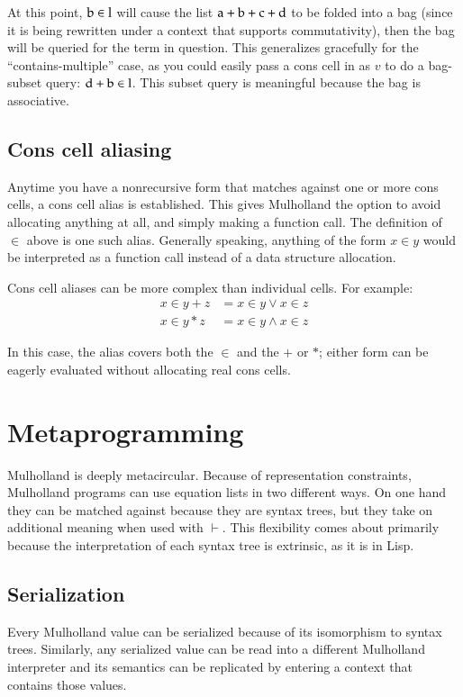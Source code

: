 \documentclass{report}
\def\rewrite {\vdash}
\begin{document}
    At this point, $\textrm b \in \textrm l$ will cause the list $\textrm a + \textrm b + \textrm c + \textrm d$ to be folded into a bag (since it is being rewritten under a
    context that supports commutativity), then the bag will be queried for the term in question. This generalizes gracefully for the ``contains-multiple'' case, as you could easily pass a cons
    cell in as $v$ to do a bag-subset query: $\textrm d + \textrm b \in \textrm l$. This subset query is meaningful because the bag is associative.

\section{Cons cell aliasing}
    Anytime you have a nonrecursive form that matches against one or more cons cells, a cons cell alias is established. This gives Mulholland the option to avoid allocating anything at all,
    and simply making a function call. The definition of $\in$ above is one such alias. Generally speaking, anything of the form $x \in y$ would be interpreted as a function call instead of a
    data structure allocation.

    Cons cell aliases can be more complex than individual cells. For example:
\begin{align*}
x \in y + z & = x \in y \vee x \in z \\
x \in y * z & = x \in y \wedge x \in z
\end{align*}

    In this case, the alias covers both the $\in$ and the $+$ or $*$; either form can be eagerly evaluated without allocating real cons cells.

\chapter{Metaprogramming}
  Mulholland is deeply metacircular. Because of representation constraints, Mulholland programs can use equation lists in two different ways. On one hand they can be matched against because
  they are syntax trees, but they take on additional meaning when used with $\rewrite$. This flexibility comes about primarily because the interpretation of each syntax tree is extrinsic, as
  it is in Lisp.

\section{Serialization}
    Every Mulholland value can be serialized because of its isomorphism to syntax trees. Similarly, any serialized value can be read into a different Mulholland interpreter and its semantics
    can be replicated by entering a context that contains those values.
\end{document}
